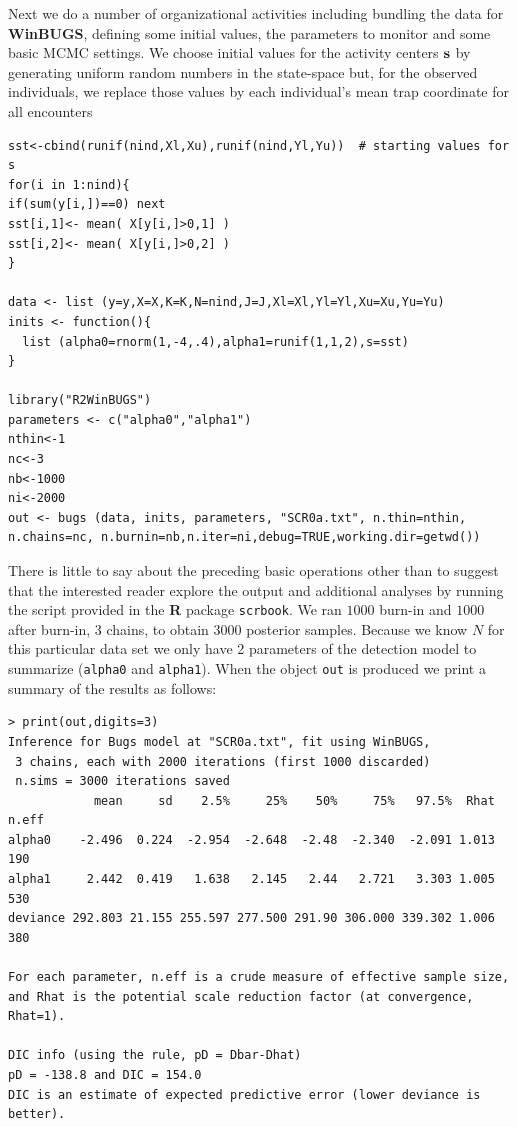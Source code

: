 Next we do a number of organizational activities including bundling
the data for {\bf WinBUGS}, defining some initial values, the parameters to
monitor and some basic MCMC settings.  We choose initial values for
the activity centers ${\bf s}$ by generating uniform random numbers in
the state-space but, for the observed individuals, we replace those
values by each individual's mean trap coordinate for all encounters
{\small
\begin{verbatim}
sst<-cbind(runif(nind,Xl,Xu),runif(nind,Yl,Yu))  # starting values for s
for(i in 1:nind){
if(sum(y[i,])==0) next
sst[i,1]<- mean( X[y[i,]>0,1] )
sst[i,2]<- mean( X[y[i,]>0,2] )
}

data <- list (y=y,X=X,K=K,N=nind,J=J,Xl=Xl,Yl=Yl,Xu=Xu,Yu=Yu)
inits <- function(){
  list (alpha0=rnorm(1,-4,.4),alpha1=runif(1,1,2),s=sst)
}

library("R2WinBUGS")
parameters <- c("alpha0","alpha1")
nthin<-1
nc<-3
nb<-1000
ni<-2000
out <- bugs (data, inits, parameters, "SCR0a.txt", n.thin=nthin,
n.chains=nc, n.burnin=nb,n.iter=ni,debug=TRUE,working.dir=getwd())
\end{verbatim}
}
There is little to say about the preceding basic operations other than
to suggest that the interested reader explore the output and
additional analyses by running the script provided in the {\bf R}
package \mbox{\tt scrbook}.
 We ran $1000$ burn-in and $1000$ after burn-in, 3 chains,
to obtain 3000 posterior samples.  Because we know $N$ for this
particular data set we only have 2 parameters of the detection model
to summarize (\mbox{\tt alpha0} and \mbox{\tt alpha1}).  When the
object \mbox{\tt out} is produced we print a summary of the results as
follows:
{\small
\begin{verbatim}
> print(out,digits=3)
Inference for Bugs model at "SCR0a.txt", fit using WinBUGS,
 3 chains, each with 2000 iterations (first 1000 discarded)
 n.sims = 3000 iterations saved
            mean     sd    2.5%     25%    50%     75%   97.5%  Rhat n.eff
alpha0    -2.496  0.224  -2.954  -2.648  -2.48  -2.340  -2.091 1.013   190
alpha1     2.442  0.419   1.638   2.145   2.44   2.721   3.303 1.005   530
deviance 292.803 21.155 255.597 277.500 291.90 306.000 339.302 1.006   380

For each parameter, n.eff is a crude measure of effective sample size,
and Rhat is the potential scale reduction factor (at convergence, Rhat=1).

DIC info (using the rule, pD = Dbar-Dhat)
pD = -138.8 and DIC = 154.0
DIC is an estimate of expected predictive error (lower deviance is better).
\end{verbatim}
}

